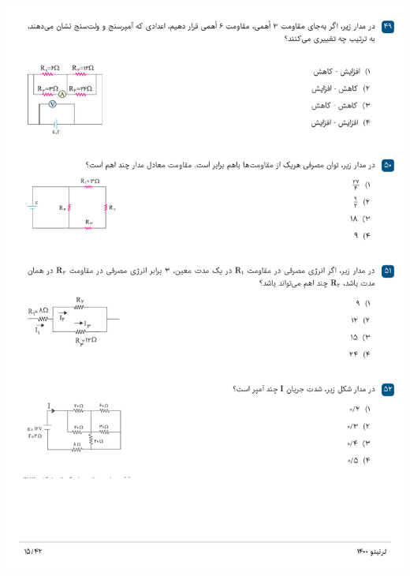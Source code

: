 \documentclass{book}
\begin{document}
\includegraphics[width=\textwidth]{"pages/15"}
\end{document}
